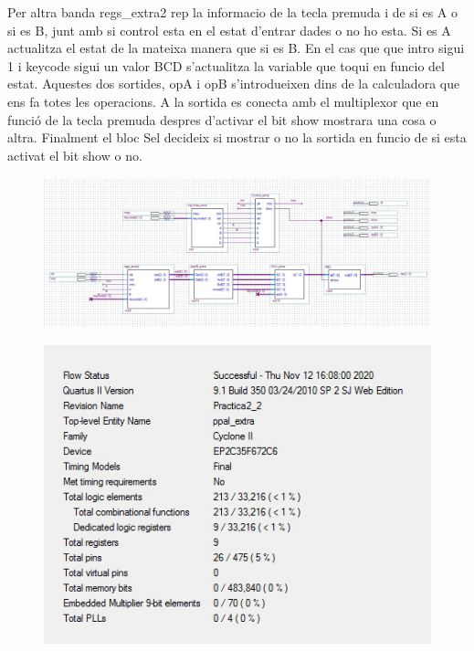 \documentclass[12pt, a4papre]{article}
\begin{document}
	Per altra banda regs\_extra2 rep la informacio de la tecla premuda i de si es A o si es B, junt amb si control esta en el estat d'entrar dades o no ho esta. Si es A actualitza el estat de la mateixa manera que si es B. En el cas que que intro sigui 1 i keycode sigui un valor BCD s'actualitza la variable que toqui en funcio del estat. Aquestes dos sortides, opA i opB s'introdueixen dins de la calculadora que ens fa totes les operacions. A la sortida es conecta amb el multiplexor que en funció de la tecla premuda despres d'activar el bit show mostrara una cosa o altra. Finalment el bloc Sel decideix si mostrar o no la sortida en funcio de si esta activat el bit show o no.
	
	\begin{figure}[H]
		\begin{center}
		\includegraphics[width=130mm]{ppalExtra.jpeg}
		\end{center}
	\end{figure}
	
	\begin{figure}[H]
		\begin{center}
		\includegraphics[width=130mm]{informePpalextra.jpeg}
		\end{center}
	\end{figure}
	
\end{document}
